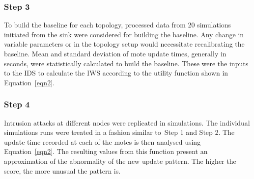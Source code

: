 \documentclass[conference]{IEEEtran}
\newcommand{\notedme}[1]{\raisebox{0pt}[0pt][0pt]{\pdfcomment[open=true,color=blue]{#1}}}
\begin{document}
\subsubsection*{Step 3} 
To build the baseline for each topology, processed data from 20 simulations initiated from the sink were considered for building the baseline.
Any change in variable parameters or in the topology setup would necessitate recalibrating the baseline.
Mean and standard deviation of mote update times, generally in seconds, were statistically calculated to build the baseline.
These were the inputs to the IDS to calculate the IWS according to the utility function shown in Equation~\ref{eqn2}. 


\subsubsection*{Step 4} 
Intrusion attacks at different nodes were replicated in simulations.
The individual simulations runs were treated in a fashion  similar to~Step 1 and Step 2.
The update time recorded at each of the motes is then analysed using Equation~\ref{eqn2}.
The resulting values from this function present an approximation of the abnormality of the new update pattern. The higher the score, the more unusual the pattern is. 
\end{document}
